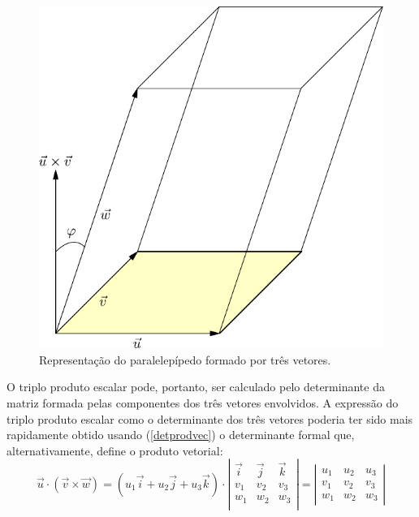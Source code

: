 \begin{figure}%
\begin{center}
   \includegraphics{./cap_algvet/figs/volume_determinante}
   \caption{Representação do paralelepípedo formado por três vetores.}\label{fig:volume_determinante}   
  \end{center}\end{figure}
O triplo produto escalar pode, portanto, ser calculado pelo determinante da matriz formada pelas componentes dos três vetores envolvidos. A expressão do triplo produto escalar como o determinante dos três vetores poderia ter sido mais rapidamente obtido usando (\ref{detprodvec}) o determinante formal que, alternativamente, define o produto vetorial:
\begin{equation}
\vec{u}\cdot (\vec{v}\times \vec{w})
=\left(u_1\vec{i}+u_2\vec{j}+u_3\vec{k}\right)\cdot\left|\begin{array}{ccc}
\vec{i}&\vec{j}&\vec{k}\\
v_1 & v_2 & v_3\\
w_1 & w_2 & w_3\\
\end{array}
\right|=\left|\begin{array}{ccc}
	  u_1&u_2&u_3\\
	  v_1&v_2&v_3\\
	  w_1&w_2&w_3
       \end{array}
 \right|
\end{equation}



